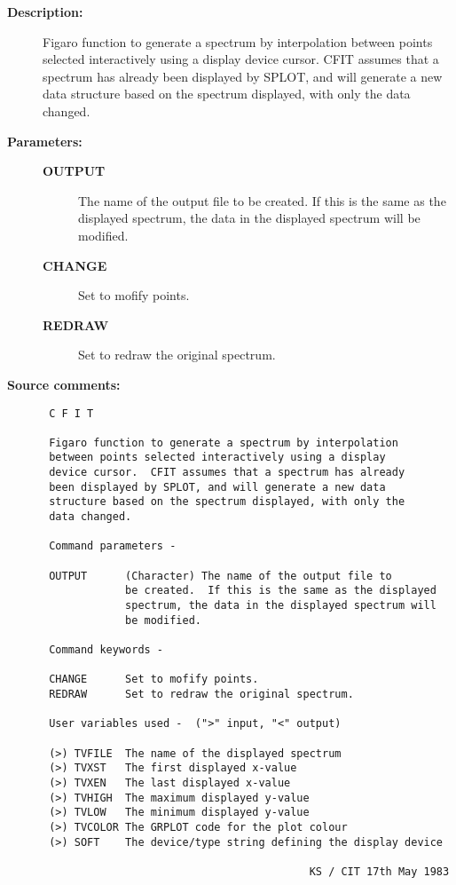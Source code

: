 \begin{description}

\item [{\bf Description:}]
 Figaro function to generate a spectrum by interpolation
 between points selected interactively using a display
 device cursor.  CFIT assumes that a spectrum has already
 been displayed by SPLOT, and will generate a new data
 structure based on the spectrum displayed, with only the
 data changed.

\item [{\bf Parameters:}]
\begin{description}
\item [{\bf OUTPUT}]
 The name of the output file to be created.  If this is the same as
 the displayed spectrum, the data in the displayed spectrum will be
 modified.
\item [{\bf CHANGE}]
 Set to mofify points.
\item [{\bf REDRAW}]
 Set to redraw the original spectrum.
\end{description}

\item [{\bf Source comments:}]
\begin{verbatim}
 C F I T

 Figaro function to generate a spectrum by interpolation
 between points selected interactively using a display
 device cursor.  CFIT assumes that a spectrum has already
 been displayed by SPLOT, and will generate a new data
 structure based on the spectrum displayed, with only the
 data changed.

 Command parameters -

 OUTPUT      (Character) The name of the output file to
             be created.  If this is the same as the displayed
             spectrum, the data in the displayed spectrum will
             be modified.

 Command keywords -

 CHANGE      Set to mofify points.
 REDRAW      Set to redraw the original spectrum.

 User variables used -  (">" input, "<" output)

 (>) TVFILE  The name of the displayed spectrum
 (>) TVXST   The first displayed x-value
 (>) TVXEN   The last displayed x-value
 (>) TVHIGH  The maximum displayed y-value
 (>) TVLOW   The minimum displayed y-value
 (>) TVCOLOR The GRPLOT code for the plot colour
 (>) SOFT    The device/type string defining the display device

                                          KS / CIT 17th May 1983
\end{verbatim}
\end{description}
